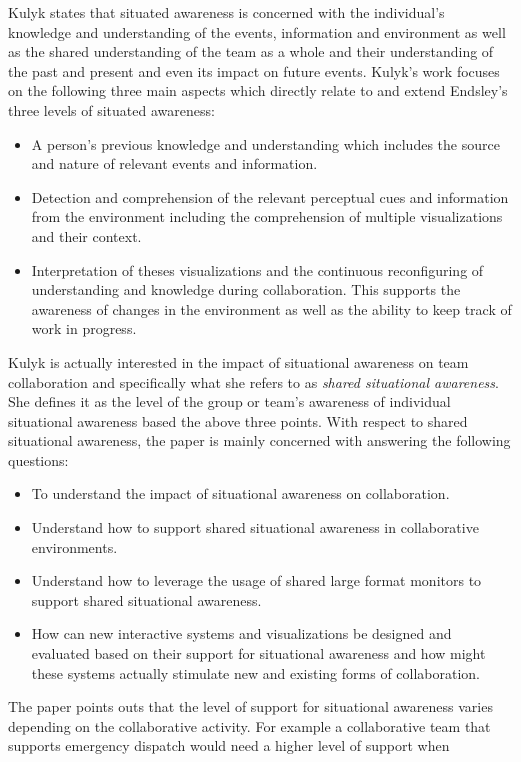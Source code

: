 \documentclass{sig-alternate}
\begin{document}
Kulyk states that situated awareness is concerned with the individual's knowledge
and understanding of the events, information and environment as well as the
shared understanding of the team as a whole and their understanding of the past
and present and even its impact on future events. Kulyk's work focuses on the
following three main aspects which directly relate to and extend Endsley's three
levels of situated awareness:
\begin{itemize}
  \item A person's previous knowledge and understanding which includes the
  source and nature of relevant events and information.
  \item Detection and comprehension of the relevant perceptual cues and
  information from the environment including the comprehension of multiple
  visualizations and their context.
  \item Interpretation of theses visualizations and the continuous reconfiguring
  of understanding and knowledge during collaboration. This supports the
  awareness of changes in the environment as well as the ability to keep track
  of work in progress.\end{itemize} Kulyk is actually interested in the impact
  of situational awareness on team collaboration and specifically what she
  refers to as \emph{shared situational awareness}. She defines it as the level
  of the group or team's awareness of individual situational awareness based
  the above three points. With respect to shared situational awareness, the
  paper is mainly concerned with answering the following questions:
\begin{itemize}
  \item To understand the impact of situational awareness on
  collaboration.
  \item Understand how to support shared situational awareness in collaborative
  environments.
  \item Understand how to leverage the usage of shared large format monitors to
  support shared situational awareness.
  \item How can new interactive systems and visualizations be designed and
  evaluated based on their support for situational awareness and how might these
  systems actually stimulate new and existing forms of collaboration.
\end{itemize}
The paper points outs that the level of support for situational awareness
varies depending on the collaborative activity. For example a collaborative team
that supports emergency dispatch would need a higher level of support when
\end{document}
